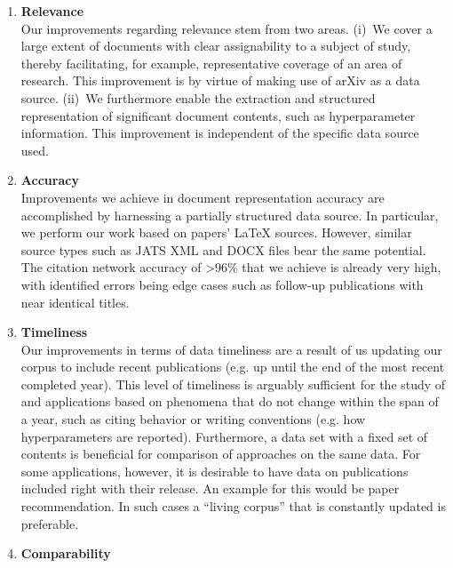 \begin{enumerate}
\item \textbf{Relevance}\\
Our improvements regarding relevance stem from two areas. (i)~We cover a large extent of documents with clear assignability to a subject of study, thereby facilitating, for example, representative coverage of an area of research. This improvement is by virtue of making use of arXiv as a data source. (ii)~We furthermore enable the extraction and structured representation of significant document contents, such as hyperparameter information. This improvement is independent of the specific data source used.
\item \textbf{Accuracy}\\
Improvements we achieve in document representation accuracy are accomplished by harnessing a partially structured data source. In particular, we perform our work based on papers' \LaTeX{} sources. However, similar source types such as JATS XML and DOCX files bear the same potential. %
The citation network accuracy of >96\% that we achieve is already very high, with identified errors being edge cases such as follow-up publications with near identical titles. %
\item \textbf{Timeliness}\\
Our improvements in terms of data timeliness are a result of us updating our corpus to include recent publications (e.g. up until the end of the most recent completed year). This level of timeliness is arguably sufficient for the study of and applications based on phenomena that do not change within the span of a year, such as citing behavior or writing conventions (e.g. how hyperparameters are reported). Furthermore, a data set with a fixed set of contents is beneficial for comparison of approaches on the same data. For some applications, however, it is desirable to have data on publications included right with their release. An example for this would be paper recommendation. In such cases a ``living corpus'' that is constantly updated is preferable. %
\item \textbf{Comparability}\\

\end{enumerate}
